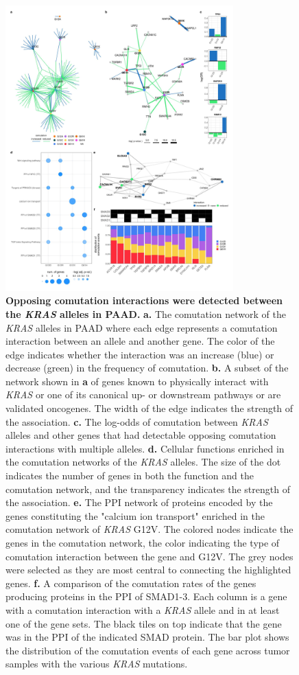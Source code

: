 \documentclass[english, 12pt, letterpaper]{article}
\newcommand{\KRAS}{\emph{KRAS}}
\begin{document}
\begin{figure}[p]
\centering
\includegraphics[height=110mm]{figures/SuppFigure_12.jpeg}
\caption{
    \textbf{Opposing comutation interactions were detected between the \KRAS{} alleles in PAAD.}
    \textbf{a.} The comutation network of the \KRAS{} alleles in PAAD where each edge represents a comutation interaction between an allele and another gene. The color of the edge indicates whether the interaction was an increase (blue) or decrease (green) in the frequency of comutation.
    \textbf{b.} A subset of the network shown in \textbf{a} of genes known to physically interact with \KRAS{} or one of its canonical up- or downstream pathways or are validated oncogenes. The width of the edge indicates the strength of the association.
    \textbf{c.} The log-odds of comutation between \KRAS{} alleles and other genes that had detectable opposing comutation interactions with multiple alleles.
    \textbf{d.} Cellular functions enriched in the comutation networks of the \KRAS{} alleles. The size of the dot indicates the number of genes in both the function and the comutation network, and the transparency indicates the strength of the association.
    \textbf{e.} The PPI network of proteins encoded by the genes constituting the "calcium ion transport" enriched in the comutation network of \KRAS{} G12V. The colored nodes indicate the genes in the comutation network, the color indicating the type of comutation interaction between the gene and G12V. The grey nodes were selected as they are most central to connecting the highlighted genes.
    \textbf{f.} A comparison of the comutation rates of the genes producing proteins in the PPI of SMAD1-3. Each column is a gene with a comutation interaction with a \KRAS{} allele and in at least one of the gene sets. The black tiles on top indicate that the gene was in the PPI of the indicated SMAD protein. The bar plot shows the distribution of the comutation events of each gene across tumor samples with the various \KRAS{} mutations.
}
\label{sfig:paad-comutation}
\end{figure}
\end{document}
